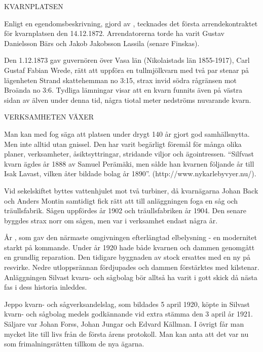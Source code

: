 KVARNPLATSEN

Enligt en egendomsbeskrivning, gjord av , tecknades det första arrendekontraktet för kvarnplatsen den 14.12.1872. Arrendatorerna torde ha varit Gustav Danielsson Bärs och Jakob Jakobsson Lassila (senare Finskas).

Den 1.12.1873 gav guvernören över Vasa län (Nikolaistads län 1855-1917), Carl Gustaf Fabian Wrede, rätt att uppföra en tullmjölkvarn med två par stenar på lägenheten Strand skattehemman no 3:15, strax invid södra rågränsen mot Broända no 3:6. Tydliga lämningar visar att en kvarn funnits även på västra sidan av älven under denna tid, några tiotal meter nedströms nuvarande kvarn.


VERKSAMHETEN VÄXER

Man kan med fog säga att platsen under drygt 140 år gjort god samhällsnytta. Men inte alltid utan gnissel. Den har varit begärligt föremål för många olika planer, verksamheter, åsiktsyttringar, stridande viljor och ägointressen. ``Silfvast kvarn ägdes år 1888 av Samuel Perämäki, men sålde han kvarnen följande år till Isak Lavast, vilken åter bildade bolag år 1890''. (http://www.nykarlebyvyer.nu/).

Vid sekelskiftet byttes vattenhjulet mot två turbiner, då kvarnägarna Johan Back och Anders Montin samtidigt fick rätt att till anläggningen foga en såg och träullsfabrik. Sågen uppfördes år 1902 och träullsfabriken år 1904. Den senare byggdes strax norr om sågen, men var i verksamhet endast några år.

År , som gav den närmaste omgivningen efterlängtad elbelysning - en modernitet starkt på kommande. Under år 1920 hade både kvarnen och dammen genomgått en grundlig reparation. Den tidigare byggnaden av stock ersattes med en ny på resvirke. Nedre utloppsrännan fördjupades och dammen förstärktes med kilstenar. Anläggningen Silvast kvarn- och sågbolag bör alltså ha varit i gott skick då nästa fas i dess historia inleddes.

Jeppo kvarn- och sågverksandelslag, som bildades 5 april 1920,  köpte in Silvast kvarn- och sågbolag medels godkännande vid extra stämma den 3 april år 1921. Säljare var Johan Forss, Johan Jungar och Edvard Källman. I övrigt får man mycket lite till livs från de första årens protokoll. Man kan anta att det var nu som frimalningsrätten tillkom de nya ägarna.

